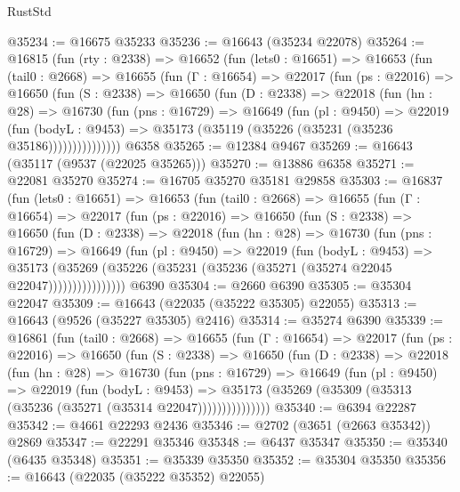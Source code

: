 \begin{lexlean}{RustStd}
\begin{coremodule}
@35234 := @16675 @35233
@35236 := @16643 (@35234 @22078)
@35264 := @16815
    (fun (rty : @2338) =>
    @16652
      (fun (lets0 : @16651) =>
      @16653
        (fun (tail0 : @2668) =>
        @16655
          (fun (Γ : @16654) =>
          @22017
            (fun (ps : @22016) =>
            @16650
              (fun (S : @2338) =>
              @16650
                (fun (D : @2338) =>
                @22018
                  (fun (hn : @28) =>
                  @16730
                    (fun (pns : @16729) =>
                    @16649
                      (fun (pl : @9450) =>
                      @22019
                        (fun (bodyL : @9453) =>
                        @35173 (@35119 (@35226 (@35231 (@35236 @35186)))))))))))))))
    @6358
@35265 := @12384 @9467
@35269 := @16643 (@35117 (@9537 (@22025 @35265)))
@35270 := @13886 @6358
@35271 := @22081 @35270
@35274 := @16705 @35270 @35181 @29858
@35303 := @16837
    (fun (lets0 : @16651) =>
    @16653
      (fun (tail0 : @2668) =>
      @16655
        (fun (Γ : @16654) =>
        @22017
          (fun (ps : @22016) =>
          @16650
            (fun (S : @2338) =>
            @16650
              (fun (D : @2338) =>
              @22018
                (fun (hn : @28) =>
                @16730
                  (fun (pns : @16729) =>
                  @16649
                    (fun (pl : @9450) =>
                    @22019
                      (fun (bodyL : @9453) =>
                      @35173
                        (@35269
                          (@35226 (@35231 (@35236 (@35271 (@35274 @22045 @22047))))))))))))))))
    @6390
@35304 := @2660 @6390
@35305 := @35304 @22047
@35309 := @16643 (@22035 (@35222 @35305) @22055)
@35313 := @16643 (@9526 (@35227 @35305) @2416)
@35314 := @35274 @6390
@35339 := @16861
    (fun (tail0 : @2668) =>
    @16655
      (fun (Γ : @16654) =>
      @22017
        (fun (ps : @22016) =>
        @16650
          (fun (S : @2338) =>
          @16650
            (fun (D : @2338) =>
            @22018
              (fun (hn : @28) =>
              @16730
                (fun (pns : @16729) =>
                @16649
                  (fun (pl : @9450) =>
                  @22019
                    (fun (bodyL : @9453) =>
                    @35173 (@35269 (@35309 (@35313 (@35236 (@35271 (@35314 @22047)))))))))))))))
@35340 := @6394 @22287
@35342 := @4661 @22293 @2436
@35346 := @2702 (@3651 (@2663 @35342)) @2869
@35347 := @22291 @35346
@35348 := @6437 @35347
@35350 := @35340 (@6435 @35348)
@35351 := @35339 @35350
@35352 := @35304 @35350
@35356 := @16643 (@22035 (@35222 @35352) @22055)

\end{coremodule}
\end{lexlean}

